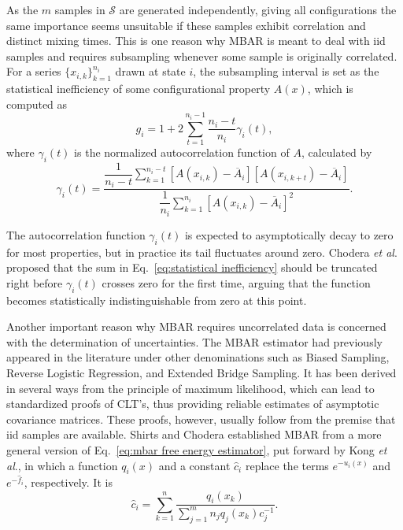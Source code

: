 \documentclass[aip,jcp,reprint,amsmath,amssymb]{revtex4-1}
\begin{document}
As the $m$ samples in $\mathcal S$ are generated independently, giving all configurations the same importance seems unsuitable if these samples exhibit correlation and distinct mixing times. This is one reason why MBAR is meant to deal with iid samples and requires subsampling whenever some sample is originally correlated.\cite{Shirts_2008} For a series $\{x_{i,k}\}_{k=1}^{n_i}$ drawn at state $i$, the subsampling interval is set as the statistical inefficiency of some configurational property $A(x)$, which is computed as\cite{Chodera_2007}
\begin{equation}
\label{eq:statistical inefficiency}
g_i = 1 + 2 \sum\limits_{t=1}^{n_i-1} \frac{n_i - t}{n_i} \gamma_i(t),
\end{equation}
where $\gamma_i(t)$ is the normalized autocorrelation function of $A$, calculated by
\begin{equation*}
\gamma_i(t) = \frac{\dfrac{1}{n_i - t} \sum\limits_{k=1}^{n_i-t} \left[A(x_{i,k}) - \overline A_i\right]\left[A(x_{i,k+t}) - \overline A_i\right]}{\dfrac{1}{n_i} \sum\limits_{k=1}^{n_i} \left[A(x_{i,k}) - \overline A_i\right]^2}.
\end{equation*}

The autocorrelation function $\gamma_i(t)$ is expected to asymptotically decay to zero for most properties, but in practice its tail fluctuates around zero. Chodera \textit{et al}.\cite{Chodera_2007} proposed that the sum in Eq.~\eqref{eq:statistical inefficiency} should be truncated right before $\gamma_i(t)$ crosses zero for the first time, arguing that the function becomes statistically indistinguishable from zero at this point.




Another important reason why MBAR requires uncorrelated data is concerned with the determination of uncertainties. The MBAR estimator had previously appeared in the literature under other denominations such as Biased Sampling,\cite{Vardi_1985, *Gill_1988} Reverse Logistic Regression,\cite{Geyer_1994} and Extended Bridge Sampling.\cite{Meng_1996, Kong_2003, Tan_2004} It has been derived in several ways from the principle of maximum likelihood, which can lead to standardized proofs of CLT's, thus providing reliable estimates of asymptotic covariance matrices.\cite{Pawitan_2001, Greene_2012} These proofs, however, usually follow from the premise that iid samples are available. Shirts and Chodera\cite{Shirts_2008} established MBAR from a more general version of Eq.~\eqref{eq:mbar free energy estimator}, put forward by Kong \textit{et al}.,\cite{Kong_2003} in which a function $q_i(x)$ and a constant $\hat c_i$ replace the terms $e^{-u_i(x)}$ and $e^{-\hat f_i}$, respectively. It is
\begin{equation}
\label{eq:mbar general estimator}
{\hat c}_i = \sum_{k=1}^n \frac{q_i(x_k)}{\sum_{j=1}^m n_j q_j(x_k) c_j^{-1}}.
\end{equation}
\end{document}
